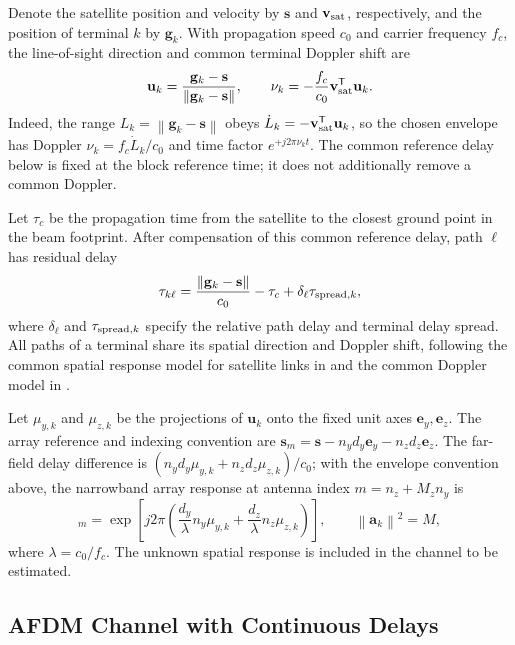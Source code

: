 \documentclass[10pt,a4paper]{article}
\newcommand{\norm}[1]{\left\lVert#1\right\rVert}
\begin{document}
Denote the satellite position and velocity by $\mathbf{s}$ and
$\mathbf{v}_{\rm sat}$, respectively, and the position of terminal $k$ by
$\mathbf{g}_k$. With propagation speed $c_0$ and carrier frequency $f_c$,
the line-of-sight direction and common terminal Doppler shift are
\begin{equation}
 \mathbf{u}_k=\frac{\mathbf{g}_k-\mathbf{s}}
 {\norm{\mathbf{g}_k-\mathbf{s}}},
 \qquad \nu_k=-\frac{f_c}{c_0}\mathbf{v}_{\rm sat}^{\mathsf T}\mathbf{u}_k.
 \label{eq:geometry}
\end{equation}
Indeed, the range $L_k=\norm{\mathbf g_k-\mathbf s}$ obeys
$\dot L_k=-\mathbf v_{\rm sat}^{\mathsf T}\mathbf u_k$, so the chosen
envelope has Doppler $\nu_k=f_c\dot L_k/c_0$ and time factor
$e^{+j2\pi\nu_kt}$. The common reference delay below is fixed at the
block reference time; it does not additionally remove a common Doppler.

Let $\tau_c$ be the propagation time from the satellite to the closest
ground point in the beam footprint. After compensation of this common
reference delay, path $\ell$ has residual delay
\begin{equation}
 \tau_{k\ell}=\frac{\norm{\mathbf{g}_k-\mathbf{s}}}{c_0}-\tau_c
             +\delta_\ell\tau_{{\rm spread},k},
 \label{eq:path-delay}
\end{equation}
where $\delta_\ell$ and $\tau_{{\rm spread},k}$ specify the relative path
delay and terminal delay spread. All paths of a terminal share its spatial
direction and Doppler shift, following the common spatial response model
for satellite links in \cite[Sec.~II-C]{li2023} and the common Doppler
model in \cite[Sec.~II]{huang2026}.

Let $\mu_{y,k}$ and $\mu_{z,k}$ be the projections of $\mathbf{u}_k$ onto
the fixed unit axes $\mathbf e_y,\mathbf e_z$. The array reference and
indexing convention are
$\mathbf s_m=\mathbf s-n_y d_y\mathbf e_y-n_zd_z\mathbf e_z$.
The far-field delay difference is
$(n_y d_y\mu_{y,k}+n_zd_z\mu_{z,k})/c_0$; with the envelope convention
above, the narrowband array response at antenna index $m=n_z+M_zn_y$ is
\begin{equation}
 [\mathbf{a}_k]_m=
 \exp\!\left[j2\pi\left(
 \frac{d_y}{\lambda}n_y\mu_{y,k}
 +\frac{d_z}{\lambda}n_z\mu_{z,k}\right)\right],
 \qquad \norm{\mathbf{a}_k}^2=M,
 \label{eq:upa}
\end{equation}
where $\lambda=c_0/f_c$. The unknown spatial response is included in the
channel to be estimated.

\subsection{AFDM Channel with Continuous Delays}
\end{document}
